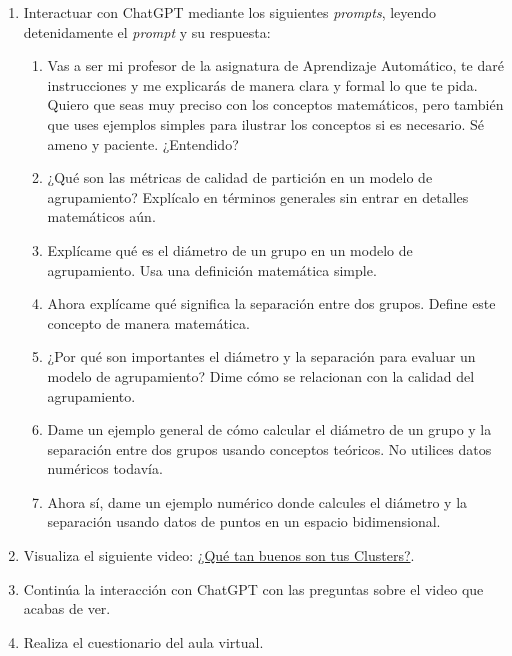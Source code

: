 \documentclass[a4,11pt]{aleph-notas}
\begin{document}
\begin{enumerate}[leftmargin=*]
    \item Interactuar con ChatGPT mediante los siguientes \textit{prompts}, leyendo detenidamente el \textit{prompt} y su respuesta:
    \begin{enumerate}[label=\textit{Prompt \arabic*.},leftmargin=2.1cm]
        \item Vas a ser mi profesor de la asignatura de Aprendizaje Automático, te daré instrucciones y me explicarás de manera clara y formal lo que te pida. Quiero que seas muy preciso con los conceptos matemáticos, pero también que uses ejemplos simples para ilustrar los conceptos si es necesario. Sé ameno y paciente. ¿Entendido?
        \item ¿Qué son las métricas de calidad de partición en un modelo de agrupamiento? Explícalo en términos generales sin entrar en detalles matemáticos aún.
        \item Explícame qué es el diámetro de un grupo en un modelo de agrupamiento. Usa una definición matemática simple.
        \item Ahora explícame qué significa la separación entre dos grupos. Define este concepto de manera matemática.
        \item ¿Por qué son importantes el diámetro y la separación para evaluar un modelo de agrupamiento? Dime cómo se relacionan con la calidad del agrupamiento.
        \item Dame un ejemplo general de cómo calcular el diámetro de un grupo y la separación entre dos grupos usando conceptos teóricos. No utilices datos numéricos todavía.
        \item Ahora sí, dame un ejemplo numérico donde calcules el diámetro y la separación usando datos de puntos en un espacio bidimensional.
    \end{enumerate}
    \item Visualiza el siguiente video: \href{https://youtu.be/b920s9nXGao?si=es5xjKYBKtfcdeTM}{¿Qué tan buenos son tus Clusters?}.
    \item Continúa la interacción con ChatGPT con las preguntas sobre el video que acabas de ver.
    \item Realiza el cuestionario del aula virtual.
\end{enumerate}
\end{document}
